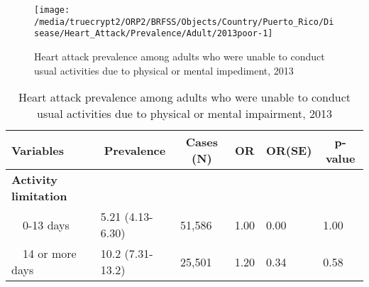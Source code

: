 \begin{figure}[H]
\caption{Heart attack prevalence among adults who were unable to conduct usual activities due to physical or mental impediment, 2013}
\label{fig:poor.Heart_Attack.2013}

\begin{knitrout}
\color{fgcolor}

{\centering \texttt{[image: /media/truecrypt2/ORP2/BRFSS/Objects/Country/Puerto\_Rico/Disease/Heart\_Attack/Prevalence/Adult/2013poor-1]} 

}



\end{knitrout}
\end{figure}

\begin{table}[H]
\caption{Heart attack prevalence among adults who were unable to conduct usual activities due to physical or mental impairment, 2013\label{tab:poor.Heart_Attack.2013}} 
\begin{center}
\begin{tabular}{llllll}
\hline\hline
\multicolumn{1}{l}{Variables}&\multicolumn{1}{c}{Prevalence}&\multicolumn{1}{c}{Cases (N)}&\multicolumn{1}{c}{OR}&\multicolumn{1}{c}{OR(SE)}&\multicolumn{1}{c}{p-value}\tabularnewline
\hline
{\bfseries Activity limitation}&&&&&\tabularnewline
~~0-13 days&5.21 (4.13-6.30)&51,586&1.00&0.00&1.00\tabularnewline
~~14 or more days&10.2 (7.31-13.2)&25,501&1.20&0.34&0.58\tabularnewline
\hline
\end{tabular}\end{center}

\end{table}


